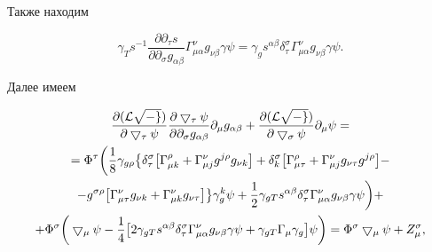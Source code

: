 Также находим


$$


\gamma_Ts^{-1}\frac{\partial\partial _\tau s}


{\partial\partial_\sigma g_{\alpha\beta}}


\Gamma^\nu_{\mu\alpha} g_{\nu\beta}\gamma\psi=


\gamma_gs^{\alpha\beta}\delta^\sigma_\tau\Gamma^\nu_{\mu\alpha}


g_{\nu\beta}\gamma\psi.


$$


Далее имеем


\begin{gather*}


\frac{\partial( \cal L\sqrt{-g})}{\partial\bigtriangledown_\tau\psi}


\frac{\partial\bigtriangledown_\tau\psi}{\partial\partial_\sigma


g_{\alpha\beta}}\partial_\mu g_{\alpha\beta}+


\frac{\partial(\cal L\sqrt{-g})}{\partial\bigtriangledown_\sigma\psi}


\partial_\mu\psi= \\


%


=\Phi^\tau\bigg(\frac{1}{8}


\gamma_{g\rho}\big\{\delta^\sigma_\tau\big[


\Gamma^\rho_{\mu k}+\Gamma^\nu_{\mu j}g^{j\rho}g_{\nu k}\big]+


\delta^\sigma_k\big[\Gamma^\rho_{\mu \tau}+\Gamma^\nu_{\mu j}


g_{\nu\tau}g^{j\rho}\big] -\\


%


-g^{\sigma\rho}\big[\Gamma^\nu_{\mu \tau}g_{\nu k}+


\Gamma^\nu_{\mu k}g_{\nu\tau}\big]\big\}\gamma^k_g\psi+


\frac{1}{2}\gamma_{gT}s^{\alpha\beta}\delta^\sigma_\tau


\Gamma^\nu_{\mu\alpha}g_{\nu\beta}\gamma\psi\bigg)+ \\


%


+\Phi^\sigma\bigg(\bigtriangledown_\mu\psi-\frac{1}{4}


\big[2\gamma_{gT}s^{\alpha\beta}\delta^\sigma_\tau


\Gamma^\nu_{\mu\alpha}g_{\nu\beta}\gamma\psi+


\gamma_{gT}\Gamma_\mu\gamma_g\big]\psi\bigg)=


\Phi^\sigma\bigtriangledown_\mu\psi+Z^\sigma_\mu,


\end{gather*}


